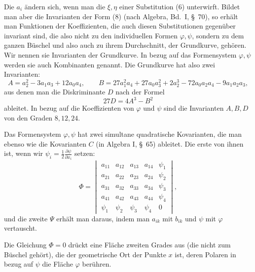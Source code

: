 \documentclass[11pt]{article}
\begin{document}
Die $a_i$ ändern sich, wenn man die $\xi,\eta$ einer Substitution (6) unterwirft. Bildet man aber die Invarianten der Form (8) (nach Algebra, Bd.~I, \S~70), so erhält man Funktionen der Koeffizienten, die auch diesen Substitutionen gegenüber invariant sind, die also nicht zu den individuellen Formen $\varphi,\psi$, sondern zu dem ganzen Büschel und also auch zu ihrem Durchschnitt, der Grundkurve, gehören. Wir nennen sie Invarianten der Grundkurve. In bezug auf das Formensystem $\varphi,\psi$ werden sie auch Kombinanten genannt. Die Grundkurve hat also zwei Invarianten:
\begin{equation}
A=a_2^2-3a_1a_3+12a_0a_4,
\qquad
B=27a_1^2a_4+27a_0a_3^2+2a_2^3-72a_0a_2a_4-9a_1a_2a_3,
\tag{9}
\end{equation}
aus denen man die Diskriminante $D$ nach der Formel
\begin{equation}
27D=4A^3-B^2
\tag{10}
\end{equation}
ableitet. In bezug auf die Koeffizienten von $\varphi$ und $\psi$ sind die Invarianten $A,B,D$ von den Graden $8,12,24$.

Das Formensystem $\varphi,\psi$ hat zwei simultane quadratische Kovarianten, die man ebenso wie die Kovarianten $C$ (in Algebra I, \S~65) ableitet. Die erste von ihnen ist, wenn wir $\psi_i=\frac12\frac{\partial\psi}{\partial x_i}$ setzen:
\begin{equation}
\Phi=
\begin{vmatrix}
a_{11}&a_{12}&a_{13}&a_{14}&\psi_1\\
a_{21}&a_{22}&a_{23}&a_{24}&\psi_2\\
a_{31}&a_{32}&a_{33}&a_{34}&\psi_3\\
a_{41}&a_{42}&a_{43}&a_{44}&\psi_4\\
\psi_1&\psi_2&\psi_3&\psi_4&0
\end{vmatrix},
\tag{11}
\end{equation}
und die zweite $\Psi$ erhält man daraus, indem man $a_{ik}$ mit $b_{ik}$ und $\psi$ mit $\varphi$ vertauscht.

Die Gleichung $\Phi=0$ drückt eine Fläche zweiten Grades aus (die nicht zum Büschel gehört), die der geometrische Ort der Punkte $x$ ist, deren Polaren in bezug auf $\psi$ die Fläche $\varphi$ berühren.
\end{document}

